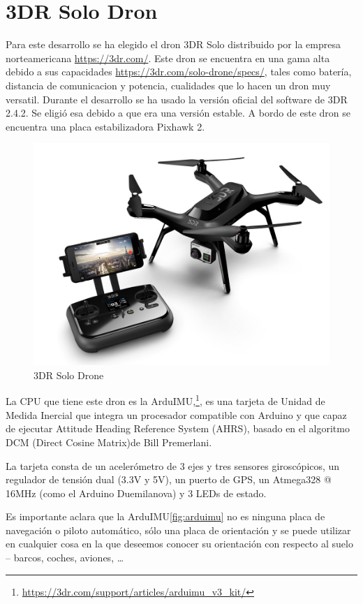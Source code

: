 \section{3DR Solo Dron}
Para este desarrollo se ha elegido el dron 3DR Solo distribuido por la empresa norteamericana \url{https://3dr.com/}. Este dron se encuentra en una gama alta debido a sus capacidades \url{https://3dr.com/solo-drone/specs/}, tales como batería, distancia de comunicacion y potencia, cualidades que lo hacen un dron muy versatil. Durante el desarrollo se ha usado la versión oficial del software de 3DR 2.4.2. Se eligió esa debido a que era una versión estable. A bordo de este dron se encuentra una placa estabilizadora Pixhawk 2.

\begin{figure}[H]
  \centering
  \includegraphics[scale=1]{imagenes/3drSoloDron.jpg}
  \caption{3DR Solo Drone}
  \label{fig:3drsolodrone}
\end{figure}

La CPU que tiene este dron es la ArduIMU,\footnote{\url{https://3dr.com/support/articles/arduimu_v3_kit/}}, es una tarjeta de Unidad de Medida Inercial que integra un procesador compatible con Arduino y que capaz de ejecutar Attitude Heading Reference System (AHRS), basado en el algoritmo DCM (Direct Cosine Matrix)de Bill Premerlani.

La tarjeta consta de un acelerómetro de 3 ejes y tres sensores giroscópicos, un regulador de tensión dual (3.3V y 5V), un puerto de GPS, un Atmega328 @ 16MHz (como el Arduino Duemilanova) y 3 LEDs de estado.

Es importante aclara que la ArduIMU\ref{fig:arduimu} no es ninguna placa de navegación o piloto automático, sólo una placa de orientación y se puede utilizar en cualquier cosa en la que deseemos conocer su orientación con respecto al suelo – barcos, coches, aviones, …

